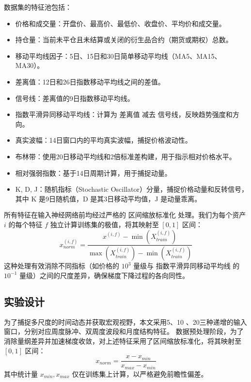 数据集的特征池包括：
\begin{itemize}
   
    \item 价格和成交量：开盘价、最高价、最低价、收盘价、平均价和成交量。
   
    \item 持仓量：当前未平仓且未结算或关闭的衍生品合约（期货或期权）总数。
    
    \item 移动平均线因子：5日、15日和30日简单移动平均线（MA5、MA15、MA30）。
   
    \item 差离值：12日和26日指数移动平均线之间的差值。
   
    \item 信号线：差离值的9日指数移动平均线。
 
    \item 指数平滑异同移动平均线：计算为 差离值 减去 信号线，反映趋势强度和方向。
    
    \item 真实波幅：14日窗口内的平均真实波幅，捕捉价格波动性。
   
    \item 布林带：使用20日移动平均线和2倍标准差构建，用于指示相对价格水平。
   
    \item 相对强弱指数：基于14日周期计算，用于捕捉动量。
    
    \item K, D, J：随机指标（Stochastic Oscillator）分量，捕捉价格动量和反转信号，其中 K 是9日随机值，D 是其3日移动平均值，J 是动量乖离。
\end{itemize}
所有特征在输入神经网络前均经过严格的 区间缩放标准化 处理。我们为每个资产 $i$ 的每个特征 $f$ 独立计算训练集的极值，将其映射至 $[0, 1]$ 区间：
\begin{equation}
    x^{(i,f)}_{norm} = \frac{x^{(i,f)} - \min(X_{train}^{(i,f)})}{\max(X_{train}^{(i,f)}) - \min(X_{train}^{(i,f)})}
\end{equation}
这种处理有效消除不同指标（如价格的 $10^3$ 量级与 指数平滑异同移动平均线 的 $10^{-1}$ 量级）之间的尺度差异，确保梯度下降过程的各向同性。
\subsection{实验设计}
为了捕捉多尺度的时间动态并获取宏观视野，本文采用5、10 、20三种递增的输入窗口，分别对应周度脉冲、双周度波段和月度结构特征。
数据预处理阶段，为了消除量纲差异并加速梯度收敛，对上述特征采用了区间缩放标准化，将其映射至 $[0, 1]$ 区间：
\begin{equation}
    x_{norm} = \frac{x - x_{min}}{x_{max} - x_{min}}
\end{equation}
其中统计量 $x_{min}, x_{max}$ 仅在训练集上计算，以严格避免前瞻性偏差。

